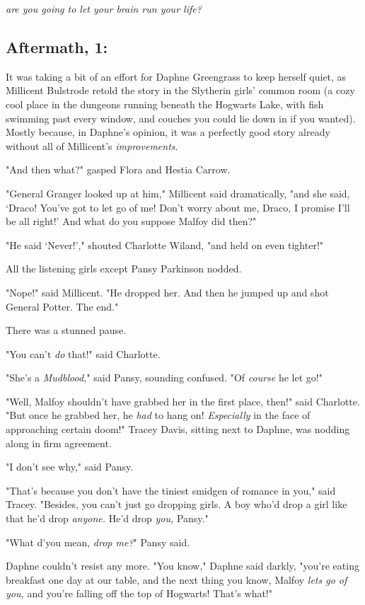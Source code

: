 {\el} \emph{are you going to let your brain run your life?}
\sbreak
\vspace{-2\baselineskip}
\subsection{Aftermath, 1:}

It was taking a bit of an effort for Daphne Greengrass to keep herself quiet,
as Millicent Bulstrode retold the story in the Slytherin girls' common room (a
cozy cool place in the dungeons running beneath the Hogwarts Lake, with fish
swimming past every window, and couches you could lie down in if you wanted).
Mostly because, in Daphne's opinion, it was a perfectly good story already
without all of Millicent's \emph{improvements}.

"And then what?" gasped Flora and Hestia Carrow.

"General Granger looked up at him," Millicent said dramatically, "and she said,
`Draco! You've got to let go of me! Don't worry about me, Draco, I promise I'll
be all right!' And what do you suppose Malfoy did then?"

"He said `Never!'," shouted Charlotte Wiland, "and held on even tighter!"

All the listening girls except Pansy Parkinson nodded.

"Nope!" said Millicent. "He dropped her. And then he jumped up and shot General
Potter. The end."

There was a stunned pause.

"You can't \emph{do} that!" said Charlotte.

"She's a \emph{Mudblood,}" said Pansy, sounding confused. "Of \emph{course} he
let go!"

"Well, Malfoy shouldn't have grabbed her in the first place, then!" said
Charlotte. "But once he grabbed her, he \emph{had} to hang on!
\emph{Especially} in the face of approaching certain doom!" Tracey Davis,
sitting next to Daphne, was nodding along in firm agreement.

"I don't see why," said Pansy.

"That's because you don't have the tiniest smidgen of romance in you," said
Tracey. "Besides, you can't just go dropping girls. A boy who'd drop a girl
like that{\el} he'd drop \emph{anyone.} He'd drop \emph{you,} Pansy."

"What d'you mean, \emph{drop me?}" Pansy said.

Daphne couldn't resist any more. "You know," Daphne said darkly, "you're eating
breakfast one day at our table, and the next thing you know, Malfoy \emph{lets
go of you,} and you're falling off the top of Hogwarts! That's what!"

